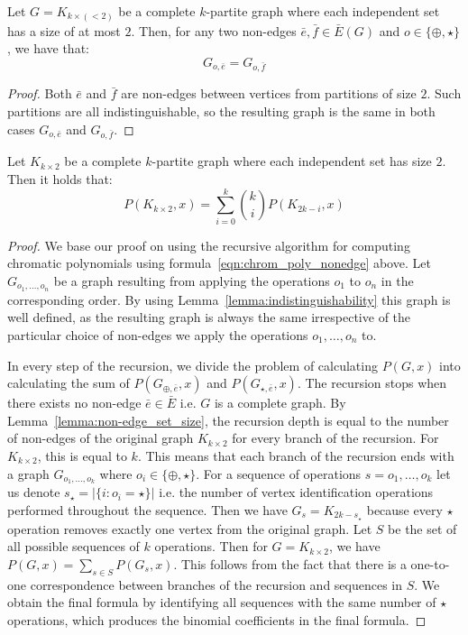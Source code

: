 \begin{lemma}
\label{lemma:indistinguishability}
    Let $G = K_{k \times (<2)}$ be a complete $k$-partite graph where each independent set has a size of at most $2$. Then, for any two non-edges $\bar{e}, \bar{f} \in \bar{E}(G)$ and $o \in \{\oplus,\star\}$, we have that:
    \[
    G_{o,\bar{e}} = G_{o,\bar{f}}
    \]
\end{lemma}

\begin{proof}
    Both $\bar{e}$ and $\bar{f}$ are non-edges between vertices from partitions of size $2$. Such partitions are all indistinguishable, so the resulting graph is the same in both cases $G_{o,\bar{e}}$ and $G_{o,\bar{f}}$.
\end{proof}

\begin{claim}
    Let $K_{k \times 2}$ be a complete $k$-partite graph where each independent set has size $2$. Then it holds that: 
    \begin{equation}\label{eqn:chromatic-pascal}
        P(K_{k \times 2},x) = \sum_{i=0}^{k} \binom{k}{i} P(K_{2k-i},x)
    \end{equation}
\end{claim}

\begin{proof}
    We base our proof on using the recursive algorithm for computing chromatic polynomials using formula~\ref{eqn:chrom_poly_nonedge} above. Let $G_{o_1,\ldots,o_n}$ be a graph resulting from applying the operations $o_1$ to $o_n$ in the corresponding order. By using Lemma~\ref{lemma:indistinguishability} this graph is well defined, as the resulting graph is always the same irrespective of the particular choice of non-edges we apply the operations $o_1, \ldots,o_n$ to.

    In every step of the recursion, we divide the problem of calculating $P(G,x)$ into calculating the sum of $P(G_{\oplus,\bar{e}},x)$ and $P(G_{\star,\bar{e}},x)$. The recursion stops when there exists no non-edge $\bar{e} \in \bar{E}$ i.e. $G$ is a complete graph. By Lemma~\ref{lemma:non-edge_set_size}, the recursion depth is equal to the number of non-edges of the original graph $K_{k\times 2}$ for every branch of the recursion. For $K_{k\times 2}$, this is equal to $k$. This means that each branch of the recursion ends with a graph $G_{o_1,\ldots,o_k}$ where $o_i \in \{\oplus,\star\}$. For a sequence of operations $s=o_1,\ldots,o_k$ let us denote $s_{\star} = |\{ i : o_i   =\star\}|$ i.e. the number of vertex identification operations performed throughout the sequence. Then we have $G_s = K_{2k-s_{\star}}$ because every $\star$ operation removes exactly one vertex from the original graph. Let $S$ be the set of all possible sequences of $k$ operations. Then for $G=K_{k\times 2}$, we have $P(G,x)= \sum_{s\in S}P(G_s,x)$. This follows from the fact that there is a one-to-one correspondence between branches of the recursion and sequences in $S$. We obtain the final formula by identifying all sequences with the same number of $\star$ operations, which produces the binomial coefficients in the final formula. 
\end{proof}


